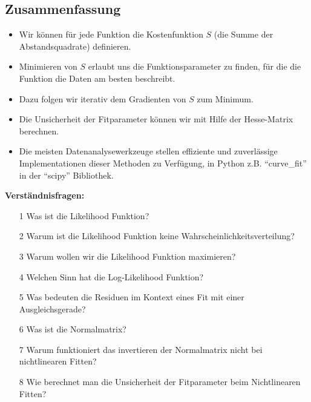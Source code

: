 \subsection{Zusammenfassung}
\label{subsec:vl9-4}

\begin{itemize}
    \setlength\itemsep{0em}
        \item Wir können für jede Funktion die Kostenfunktion $S$ (die Summe der Abstandsquadrate) definieren.
        \item Minimieren von $S$ erlaubt uns die Funktionsparameter zu finden, für die die Funktion die Daten am besten beschreibt.
        \item Dazu folgen wir iterativ dem Gradienten von $S$ zum Minimum.
        \item Die Unsicherheit der Fitparameter können wir mit Hilfe der Hesse-Matrix berechnen.
        \item Die meisten Datenanalysewerkzeuge stellen effiziente und zuverlässige Implementationen dieser Methoden zu Verfügung, in Python z.B. ``curve\_fit'' in der ``scipy'' Bibliothek.
\end{itemize}


\newpage

\begin{tcolorbox}[enhanced,width=6in,
    fontupper=\small,drop fuzzy shadow southwest,
    colframe=black!50!black,colback=black!5]
\textbf{Verständnisfragen:} \\
\begin{enumerate}
\item[1] Was ist die Likelihood Funktion?
\item[2] Warum ist die Likelihood Funktion keine Wahrscheinlichkeitsverteilung? 
\item[3] Warum wollen wir die Likelihood Funktion maximieren? 
\item[4] Welchen Sinn hat die Log-Likelihood Funktion? 
\item[5] Was bedeuten die Residuen im Kontext eines Fit mit einer Ausgleichsgerade? 
\item[6] Was ist die Normalmatrix? 
\item[7] Warum funktioniert das invertieren der Normalmatrix nicht bei nichtlinearen Fitten? 
\item[8] Wie berechnet man die Unsicherheit der Fitparameter beim Nichtlinearen Fitten? 
\end{enumerate}
\end{tcolorbox}

